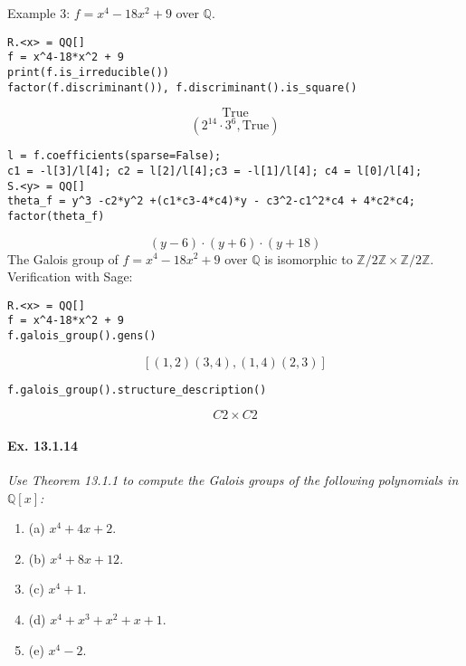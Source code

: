 \documentclass[11pt,a4paper]{article}
\newcommand{\be} {\begin{enumerate}}
\newcommand{\ee} {\end{enumerate}}
\newcommand{\Q}{\mathbb{Q}}
\newcommand{\Z}{\mathbb{Z}}
\begin{document}
Example 3: $f = x^4-18x^2+9$ over $\Q$.
\begin{verbatim}
R.<x> = QQ[]
f = x^4-18*x^2 + 9
print(f.is_irreducible())
factor(f.discriminant()), f.discriminant().is_square()
\end{verbatim}
$$\text{True}$$
$$(2^{14}\cdot 3^6, \text{True})$$
\begin{verbatim}
l = f.coefficients(sparse=False);
c1 = -l[3]/l[4]; c2 = l[2]/l[4];c3 = -l[1]/l[4]; c4 = l[0]/l[4];
S.<y> = QQ[]
theta_f = y^3 -c2*y^2 +(c1*c3-4*c4)*y - c3^2-c1^2*c4 + 4*c2*c4;
factor(theta_f)
\end{verbatim}
$$	
(y - 6) \cdot (y + 6) \cdot (y + 18)
$$
The Galois group of $f = x^4-18x^2+9$ over $\Q$ is isomorphic to $\Z/2\Z \times \Z/2\Z$.
Verification with Sage:
\begin{verbatim}
R.<x> = QQ[]
f = x^4-18*x^2 + 9
f.galois_group().gens()
\end{verbatim}
$$ [(1,2)(3,4), (1,4)(2,3)]$$
\begin{verbatim}
f.galois_group().structure_description()
\end{verbatim}
$$C2 \times C2$$
\paragraph{Ex. 13.1.14}

{\it Use Theorem 13.1.1 to compute the Galois groups of the following polynomials in $\Q[x]$:
\be
\item[(a)] $x^4+4x+2$.
\item[(b)] $x^4 + 8x+12$.
\item[(c)] $x^4+1$.
\item[(d)] $x^4+x^3+x^2 + x+1$.
\item[(e)] $ x^4-2$.
\ee
}
\end{document}
